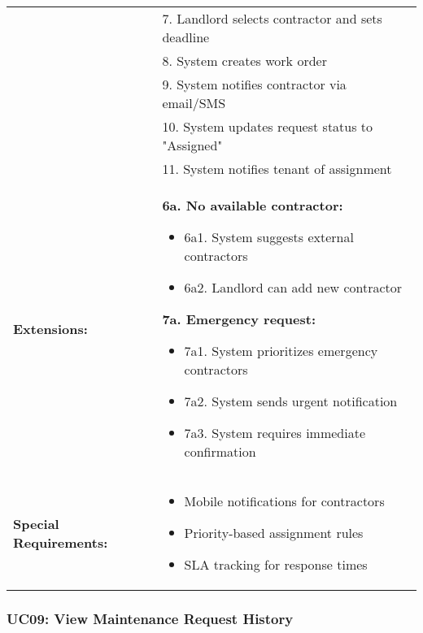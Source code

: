 \documentclass[12pt]{article}
\begin{document}
\begin{tabular}{|p{3cm}|p{11cm}|}
& 7. Landlord selects contractor and sets deadline \\
& 8. System creates work order \\
& 9. System notifies contractor via email/SMS \\
& 10. System updates request status to "Assigned" \\
& 11. System notifies tenant of assignment \\
\hline
\textbf{Extensions:} & 
\textbf{6a. No available contractor:}
\begin{itemize}
    \item 6a1. System suggests external contractors
    \item 6a2. Landlord can add new contractor
\end{itemize}
\textbf{7a. Emergency request:}
\begin{itemize}
    \item 7a1. System prioritizes emergency contractors
    \item 7a2. System sends urgent notification
    \item 7a3. System requires immediate confirmation
\end{itemize} \\
\hline
\textbf{Special Requirements:} & 
\begin{itemize}
    \item Mobile notifications for contractors
    \item Priority-based assignment rules
    \item SLA tracking for response times
\end{itemize} \\
\hline
\end{tabular}

\subsubsection{UC09: View Maintenance Request History}
\end{document}
